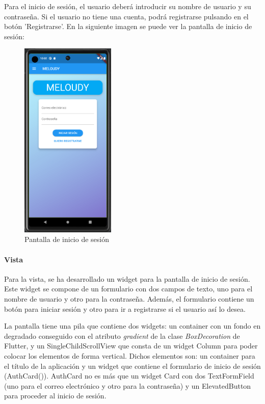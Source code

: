 Para el inicio de sesión, el usuario deberá introducir su nombre de usuario y su contraseña. Si el usuario no tiene una cuenta, podrá registrarse pulsando en el botón 'Registrarse'. En la siguiente imagen se puede ver la pantalla de inicio de sesión:
\begin{figure}[H]
    \centering
    \includegraphics[width=0.4\textwidth]{imagenes/c7/login.png}
    \caption{Pantalla de inicio de sesión}
    \label{fig:login}
\end{figure}

\paragraph*{Vista}
Para la vista, se ha desarrollado un widget para la pantalla de inicio de sesión. Este widget se compone de un formulario con dos campos de texto, uno para el nombre de usuario y otro para la contraseña. Además, el formulario contiene un botón para iniciar sesión y otro para ir a registrarse si el usuario así lo desea.

La pantalla tiene una pila que contiene dos widgets: un container con un fondo en degradado conseguido con el atributo \textit{gradient} de la clase \textit{BoxDecoration} de Flutter, y un SingleChildScrollView que consta de un widget Column para poder colocar los elementos de forma vertical. Dichos elementos son: un container para el título de la aplicación y un widget que contiene el formulario de inicio de sesión (AuthCard()).
AuthCard no es más que un widget Card con dos TextFormField (uno para el correo electrónico y otro para la contraseña) y un ElevatedButton para proceder al inicio de sesión.

